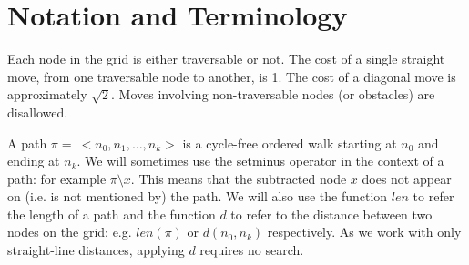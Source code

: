 \section{Notation and Terminology}
\label{sec:notation}
Each node in the grid is either traversable or not. 
The cost of a single straight move, from one traversable node to another, 
is 1. The cost of a diagonal move is approximately $\sqrt 2$.
Moves involving non-traversable nodes (or obstacles) are disallowed.

A path $\pi =~<n_{0}, n_{1}, \ldots , n_{k}>$ is a
cycle-free ordered walk starting at $n_{0}$ and ending at 
$n_{k}$.
We will sometimes use the setminus operator in the context of a path:
for example $\pi \setminus x$. This means that the subtracted node $x$
does not appear on (i.e. is not mentioned by) the path. 
We will also use the function $len$ to refer the length of a path 
and the function $d$ to refer to the distance between two nodes 
on the grid: e.g. $len(\pi)$ or $d(n_{0}, n_{k})$ respectively.
As we work with only straight-line distances, applying $d$ requires no search.




